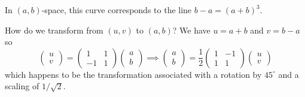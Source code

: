 \documentclass[12pt]{article}
\begin{document}
\begin{enumerate}[(i)]
          In $(a, b)$-space, this curve corresponds to the line $b - a = (a + b)^3$.

          How do we transform from $(u, v)$ to $(a, b)$? We have $u = a + b$ and $v = b - a$ so
          \[\begin{pmatrix}
                  u \\v
              \end{pmatrix} = \begin{pmatrix}
                  1  & 1 \\
                  -1 & 1
              \end{pmatrix} \begin{pmatrix}
                  a \\b
              \end{pmatrix} \implies \begin{pmatrix}
                  a \\b
              \end{pmatrix} = \frac{1}{2}\begin{pmatrix}
                  1 & -1 \\
                  1 & 1
              \end{pmatrix}\begin{pmatrix}
                  u \\v
              \end{pmatrix}\]
          which happens to be the transformation associated with a rotation by $45^\circ$ and a scaling of $1/\sqrt{2}$.

          \begin{center}
              \color{black}
          \end{center}


\end{enumerate}
\end{document}
